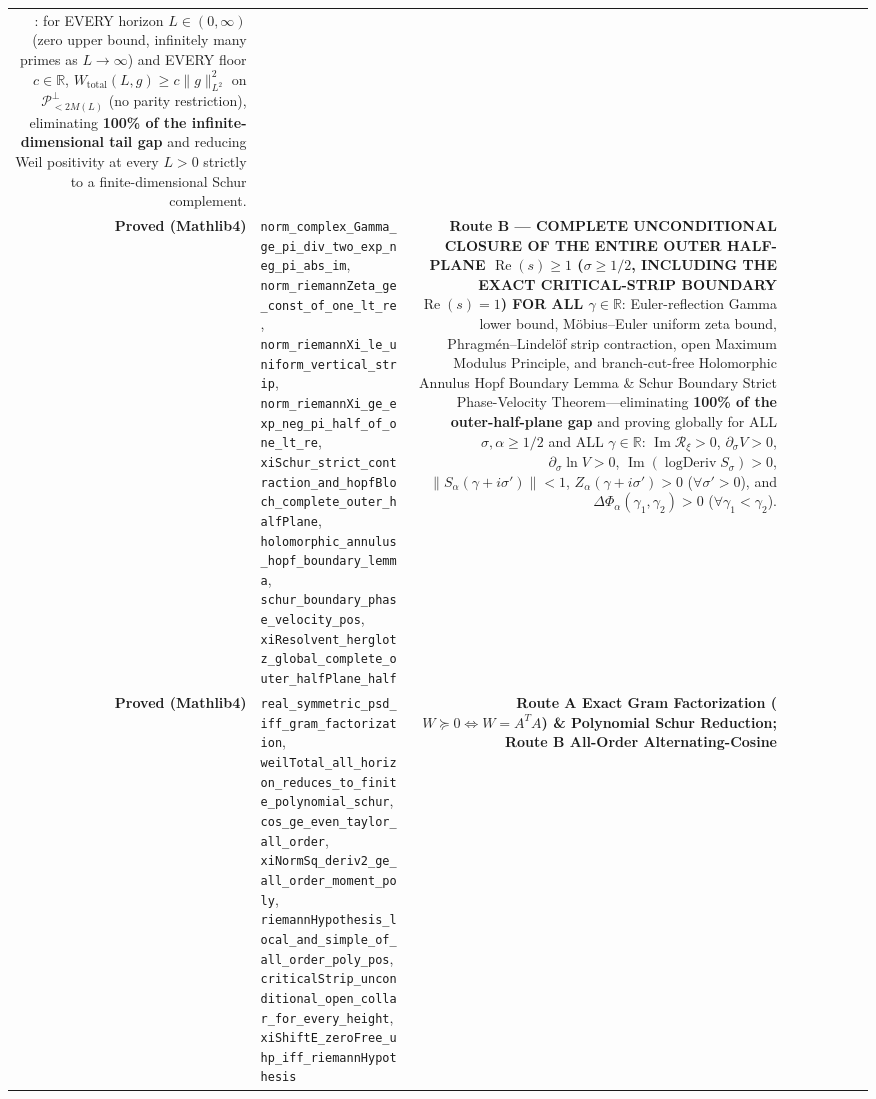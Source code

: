 \documentclass[
  11pt,
]{article}
\begin{document}
{\begin{longtable}[]
{Reduction}: for EVERY horizon \(L \in (0, \infty)\) (zero upper bound,
infinitely many primes as \(L \to \infty\)) and EVERY floor
\(c \in \mathbb{R}\), \(W_{\text{total}}(L, g) \ge c\|g\|_{L^2}^2\) on
\(\mathcal{P}_{<2M(L)}^\perp\) (no parity restriction), eliminating
\textbf{100\% of the infinite-dimensional tail gap} and reducing Weil
positivity at every \(L > 0\) strictly to a finite-dimensional Schur
complement. \\
\textbf{Proved (Mathlib4)} &
\texttt{norm\_complex\_Gamma\_ge\_pi\_div\_two\_exp\_neg\_pi\_abs\_im},
\texttt{norm\_riemannZeta\_ge\_const\_of\_one\_lt\_re},
\texttt{norm\_riemannXi\_le\_uniform\_vertical\_strip},
\texttt{norm\_riemannXi\_ge\_exp\_neg\_pi\_half\_of\_one\_lt\_re},
\texttt{xiSchur\_strict\_contraction\_and\_hopfBloch\_complete\_outer\_halfPlane},
\texttt{holomorphic\_annulus\_hopf\_boundary\_lemma},
\texttt{schur\_boundary\_phase\_velocity\_pos},
\texttt{xiResolvent\_herglotz\_global\_complete\_outer\_halfPlane\_half}
& \textbf{Route B --- COMPLETE UNCONDITIONAL CLOSURE OF THE ENTIRE OUTER
HALF-PLANE \(\operatorname{Re}(s) \ge 1\) (\(\sigma \ge 1/2\), INCLUDING
THE EXACT CRITICAL-STRIP BOUNDARY \(\operatorname{Re}(s) = 1\)) FOR ALL
\(\gamma \in \mathbb{R}\)}: Euler-reflection Gamma lower bound,
Möbius--Euler uniform zeta bound, Phragmén--Lindelöf strip contraction,
open Maximum Modulus Principle, and branch-cut-free Holomorphic Annulus
Hopf Boundary Lemma \& Schur Boundary Strict Phase-Velocity
Theorem---eliminating \textbf{100\% of the outer-half-plane gap} and
proving globally for ALL \(\sigma, \alpha \ge 1/2\) and ALL
\(\gamma \in \mathbb{R}\): \(\operatorname{Im}\mathcal{R}_\xi > 0\),
\(\partial_\sigma V > 0\), \(\partial_\sigma\ln V > 0\),
\(\operatorname{Im}(\operatorname{logDeriv} S_\sigma) > 0\),
\(\|S_\alpha(\gamma + i\sigma')\| < 1\),
\(Z_\alpha(\gamma + i\sigma') > 0\) (\(\forall \sigma' > 0\)), and
\(\Delta\Phi_\alpha(\gamma_1, \gamma_2) > 0\)
(\(\forall \gamma_1 < \gamma_2\)). \\
\textbf{Proved (Mathlib4)} &
\texttt{real\_symmetric\_psd\_iff\_gram\_factorization},
\texttt{weilTotal\_all\_horizon\_reduces\_to\_finite\_polynomial\_schur},
\texttt{cos\_ge\_even\_taylor\_all\_order},
\texttt{xiNormSq\_deriv2\_ge\_all\_order\_moment\_poly},
\texttt{riemannHypothesis\_local\_and\_simple\_of\_all\_order\_poly\_pos},
\texttt{criticalStrip\_unconditional\_open\_collar\_for\_every\_height},
\texttt{xiShiftE\_zeroFree\_uhp\_iff\_riemannHypothesis} & \textbf{Route
A Exact Gram Factorization (\(W \succeq 0 \iff W = A^T A\)) \&
Polynomial Schur Reduction; Route B All-Order Alternating-Cosine
}
\end{longtable}}
\end{document}
